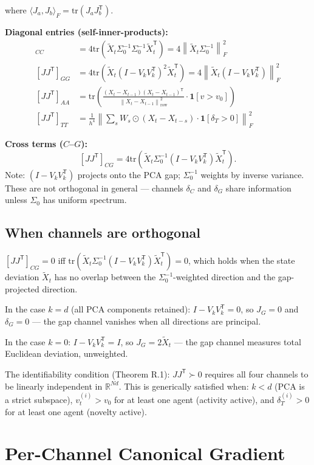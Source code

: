 \documentclass[11pt,a4paper]{article}
\theoremstyle{definition}
\newcommand{\R}{\mathbb{R}}
\newcommand{\T}{^{\mathsf{T}}}
\newcommand{\norm}[1]{\left\|#1\right\|}
\newcommand{\tr}{\mathrm{tr}}
\begin{document}
where $\langle J_a, J_b\rangle_F = \tr(J_a J_b\T)$.

\textbf{Diagonal entries (self-inner-products):}
\begin{align*}
[JJ\T]_{CC} &= 4\tr(\tilde X_t\Sigma_0^{-1}\Sigma_0^{-1}\tilde X_t\T) = 4\norm{\tilde X_t\Sigma_0^{-1}}_F^2 \\
[JJ\T]_{GG} &= 4\tr(\tilde X_t(I-V_kV_k\T)^2\tilde X_t\T) = 4\norm{\tilde X_t(I-V_kV_k\T)}_F^2 \\
[JJ\T]_{AA} &= \tr\left(\frac{(X_t-X_{t-1})(X_t-X_{t-1})\T}{\norm{X_t-X_{t-1}}_\mathrm{row}^2}\cdot\mathbf{1}[v>v_0]\right) \\
[JJ\T]_{TT} &= \frac{1}{h^4}\norm{\sum_s W_s\odot(X_t-X_{t-s})\cdot\mathbf{1}[\delta_T>0]}_F^2
\end{align*}

\textbf{Cross terms ($C$--$G$):}
\[
[JJ\T]_{CG} = 4\tr(\tilde X_t\Sigma_0^{-1}(I-V_kV_k\T)\tilde X_t\T).
\]
Note: $(I-V_kV_k\T)$ projects onto the PCA gap; $\Sigma_0^{-1}$ weights by inverse variance.
These are not orthogonal in general — channels $\delta_C$ and $\delta_G$ share information
unless $\Sigma_0$ has uniform spectrum.

\subsection{When channels are orthogonal}

$[JJ\T]_{CG} = 0$ iff $\tr(\tilde X_t\Sigma_0^{-1}(I-V_kV_k\T)\tilde X_t\T) = 0$,
which holds when the state deviation $\tilde X_t$ has no overlap between
the $\Sigma_0^{-1}$-weighted direction and the gap-projected direction.

In the case $k = d$ (all PCA components retained): $I - V_kV_k\T = 0$, so
$J_G = 0$ and $\delta_G = 0$ — the gap channel vanishes when all directions are principal.

In the case $k = 0$: $I - V_kV_k\T = I$, so $J_G = 2\tilde X_t$ — the gap channel
measures total Euclidean deviation, unweighted.

The identifiability condition (Theorem R.1): $JJ\T \succ 0$ requires all four channels
to be linearly independent in $\R^{Nd}$. This is generically satisfied when:
$k < d$ (PCA is a strict subspace), $v_t^{(i)} > v_0$ for at least one agent (activity active),
and $\delta_T^{(i)} > 0$ for at least one agent (novelty active).

\section{Per-Channel Canonical Gradient}
\end{document}
